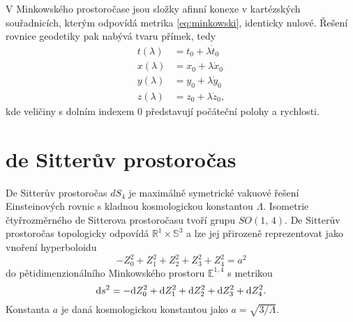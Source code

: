 V Minkowského prostoročase jsou složky afinní konexe v kartézských souřadnicích,
kterým odpovídá metrika \eqref{eq:minkowski}, identicky nulové. Řešení rovnice geodetiky pak
nabývá tvaru přímek, tedy
\begin{equation}
     \label{eq:minkowski_cartesian_geodesics}
     \begin{split}
     t(\lambda) &= t_0 + \lambda {\dot t}_0 \\
     x(\lambda) &= x_0 + \lambda {\dot x}_0 \\
     y(\lambda) &= y_0 + \lambda {\dot y}_0 \\
     z(\lambda) &= z_0 + \lambda {\dot z}_0,
     \end{split}
\end{equation}
kde veličiny s dolním indexem $0$ představují počáteční polohy a rychlosti.


\section{de Sitterův prostoročas}

De Sitterův prostoročas $dS_4$ je maximálně symetrické vakuové řešení Einsteinových rovnic s kladnou kosmologickou
konstantou $\Lambda$. Isometrie čtyřrozměrného de Sitterova prostoročasu tvoří grupu $SO(1,\,4)$. De Sitterův prostoročas topologicky odpovídá
$\mathbb{R}^1 \times \mathbb{S}^3$ a lze jej přirozeně reprezentovat jako vnoření hyperboloidu
\begin{equation}
     \label{eq:dS_hyperboloid}
     - Z_0^2 + Z_1^2 + Z_2^2 + Z_3^2 + Z_4^2 = a^2
\end{equation}
do pětidimenzionálního Minkowského prostoru $\mathbb{E}^{1,4}$ s metrikou
\begin{equation}
     \label{eq:5d_minkowski}
     \mathrm{d} s^2 = - \mathrm{d} Z_0^2 + \mathrm{d} Z_1^2 + \mathrm{d} Z_2^2 + \mathrm{d} Z_3^2 + \mathrm{d} Z_4^2.
\end{equation}
Konstanta $a$ je daná kosmologickou konstantou jako $a = \sqrt{3/\Lambda}$.

